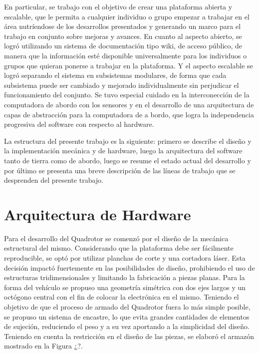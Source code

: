 \documentclass[a4paper, conference]{IEEEtran}
\begin{document}
En particular, se trabajo con el objetivo de crear una plataforma abierta y escalable, que le permita a cualquier individuo o grupo empezar a trabajar en el área nutríendose de los desarrollos presentados y generando un marco para el trabajo en conjunto sobre mejoras y avances. En cuanto al aspecto abierto, se logró utilizando un sistema de documentación tipo wiki, de acceso público, de manera que la información esté disponible universalmente para los individuos o grupos que quieran ponerse a trabajar en la plataforma. Y el aspecto escalable se logró separando el sistema en subsistemas modulares, de forma que cada subsistema puede ser cambiado y mejorado individualmente sin perjudicar el funcionamiento del conjunto. Se tuvo especial cuidado en la interconección de la computadora de abordo con los sensores y en el desarrollo de una arquitectura de capas de abstracción para la computadora de a bordo, que logra la independencia progresiva del software con respecto al hardware. 

La estructura del presente trabajo es la siguiente: primero se describe el diseño y la implementación mecánica y de hardware, luego la arquitectura del software tanto de tierra como de abordo, luego se resume el estado actual del desarrollo y por último se presenta una breve descripción de las líneas de trabajo que se desprenden del presente trabajo.


\section{Arquitectura de Hardware}

Para el desarrollo del Quadrotor se comenzó por el diseño de la mecánica estructural del mismo. Considerando que la plataforma debe ser fácilmente reproducible, se optó por utilizar planchas de corte y una cortadora láser. Esta decisión impactó fuertemente en las posibilidades de diseño, prohibiendo el uso de estructuras tridimensionales y limitando la fabricación a piezas planas. Para la forma del vehículo se propuso una geometría simétrica con dos ejes largos y un octógono central con el fin de colocar la electrónica en el mismo. Teniendo el objetivo de que el proceso de armado del Quadrotor fuera lo más simple posible, se propuso un sistema de encastre, lo que evita grandes cantidades de elementos de sujeción, reduciendo el peso y a su vez aportando a la simplicidad del diseño. Teniendo en cuenta la restricción en el diseño de las piezas, se elaboró el armazón mostrado en la Figura ¿?.
\end{document}
